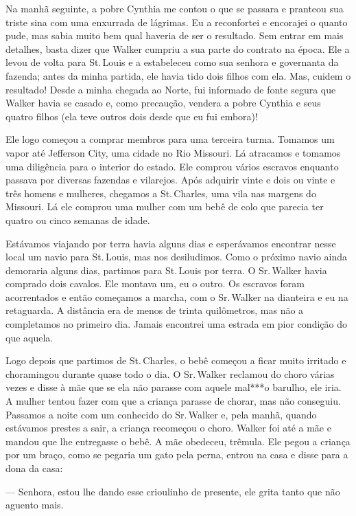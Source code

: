 Na manhã seguinte, a pobre Cynthia me contou o que se passara e pranteou
sua triste sina com uma enxurrada de lágrimas. Eu a reconfortei e
encorajei o quanto pude, mas sabia muito bem qual haveria de ser o
resultado. Sem entrar em mais detalhes, basta dizer que Walker cumpriu a
sua parte do contrato na época. Ele a levou de volta para St.\,Louis e a
estabeleceu como sua senhora e governanta da fazenda; antes da minha
partida, ele havia tido dois filhos com ela. Mas, cuidem o resultado!
Desde a minha chegada ao Norte, fui informado de fonte segura que Walker
havia se casado e, como precaução, vendera a pobre Cynthia e seus quatro
filhos (ela teve outros dois desde que eu fui embora)!

Ele logo começou a comprar membros para uma terceira turma. Tomamos um
vapor até Jefferson City, uma cidade no Rio Missouri. Lá atracamos e
tomamos uma diligência para o interior do estado. Ele comprou vários
escravos enquanto passava por diversas fazendas e vilarejos. Após
adquirir vinte e dois ou vinte e três homens e mulheres, chegamos a St.\,Charles, uma vila nas margens do Missouri. Lá ele comprou uma mulher com
um bebê de colo que parecia ter quatro ou cinco semanas de idade.

Estávamos viajando por terra havia alguns dias e esperávamos encontrar
nesse local um navio para St.\,Louis, mas nos desiludimos. Como o próximo
navio ainda demoraria alguns dias, partimos para St.\,Louis por terra. O
Sr.\,Walker havia comprado dois cavalos. Ele montava um, eu o outro. Os
escravos foram acorrentados e então começamos a marcha, com o Sr.\,Walker
na dianteira e eu na retaguarda. A distância era de menos de trinta
quilômetros, mas não a completamos no primeiro dia. Jamais encontrei uma
estrada em pior condição do que aquela.

Logo depois que partimos de St.\,Charles, o bebê começou a ficar muito
irritado e choramingou durante quase todo o dia. O Sr.\,Walker reclamou
do choro várias vezes e disse à mãe que se ela não parasse com aquele
mal***o barulho, ele iria. A mulher tentou fazer com que a criança
parasse de chorar, mas não conseguiu. Passamos a noite com um conhecido
do Sr.\,Walker e, pela manhã, quando estávamos prestes a sair, a criança
recomeçou o choro. Walker foi até a mãe e mandou que lhe entregasse o
bebê. A mãe obedeceu, trêmula. Ele pegou a criança por um braço, como se
pegaria um gato pela perna, entrou na casa e disse para a dona da casa: \label{ref9}

--- Senhora, estou lhe dando esse crioulinho de presente, ele grita
tanto que não aguento mais.

